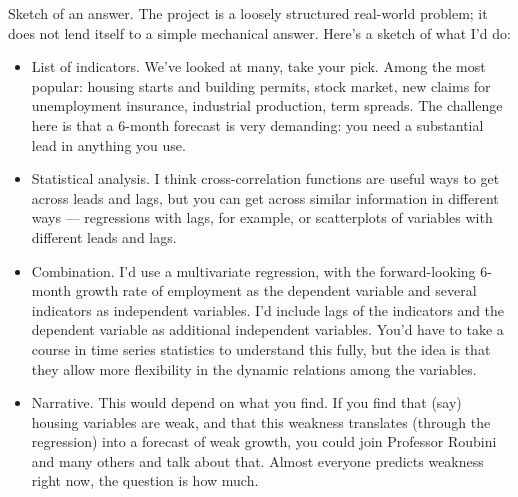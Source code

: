 \documentclass[letterpaper,12pt]{article}
\begin{document}
\newpage
{Sketch of an answer.  
The project is a loosely structured real-world problem;
it does not lend itself to a simple mechanical answer.
Here's a sketch of what I'd do: }  
\begin{itemize}
\item List of indicators.  
We've looked at many, take your pick.  
Among the most popular:  
housing starts and building permits, 
stock market, 
new claims for unemployment insurance, 
industrial production, term spreads.  
The challenge here is that a 6-month forecast is very demanding:
you need a substantial lead in anything you use.  

\item Statistical analysis.  
I think cross-correlation functions are useful ways to get across leads and lags, but you can get across similar 
information in different ways --- 
regressions with lags, for example,
or scatterplots of variables with different leads and lags.  

\item Combination.  
I'd use a multivariate regression, with the forward-looking 
6-month growth rate of employment as the dependent variable
and several indicators as independent variables.
I'd include lags of the indicators and the dependent 
variable as additional independent variables.
You'd have to take a course in time series statistics 
to understand this fully, 
but the idea is that they allow more flexibility in the dynamic relations
among the variables.  

\item Narrative.  This would depend on what you find.
If you find that (say) housing variables are weak,
and that this weakness translates (through the regression)
into a forecast of weak growth, 
you could join Professor Roubini and many others and talk about that.
Almost everyone predicts weakness right now, 
the question is how much.  

\end{itemize}
\end{document}
